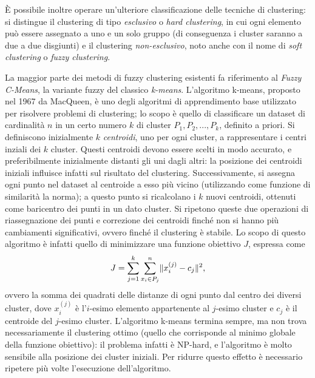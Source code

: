 \documentclass[oneside, openany]{book}
\DeclarePairedDelimiter{\norma}{\lVert}{\rVert}
\begin{document}
			\`E possibile inoltre operare un'ulteriore classificazione delle tecniche di clustering: si distingue il clustering di tipo \textit{esclusivo} o \textit{hard clustering}, in cui ogni elemento può essere assegnato a uno e un solo gruppo (di conseguenza i cluster saranno a due a due disgiunti) e il clustering \textit{non-esclusivo}, noto anche con il nome di \textit{soft clustering} o \textit{fuzzy clustering}.
			
			La maggior parte dei metodi di fuzzy clustering esistenti fa riferimento al \textit{Fuzzy C-Means}, la variante fuzzy del classico \textit{k-means}. L'algoritmo k-means, proposto nel 1967 da MacQueen, è uno degli algoritmi di apprendimento base utilizzato per risolvere problemi di clustering; lo scopo è quello di classificare un dataset di cardinalità $n$ in un certo numero $k$ di cluster $P_1,P_2,...,P_k$, definito a priori.
			Si definiscono inizialmente $k$ \textit{centroidi}, uno per ogni cluster, a rappresentare i centri inziali dei $k$ cluster. Questi centroidi devono essere scelti in modo accurato, e preferibilmente inizialmente distanti gli uni dagli altri: la posizione dei centroidi iniziali influisce infatti sul risultato del clustering. Successivamente, si assegna ogni punto nel dataset al centroide a esso più vicino (utilizzando come funzione di similarità la norma); a questo punto si ricalcolano i $k$ nuovi centroidi, ottenuti come baricentro dei punti in un dato cluster. Si ripetono queste due operazioni di riassegnazione dei punti e correzione dei centroidi finché non si hanno più cambiamenti significativi, ovvero finché il clustering è stabile. Lo scopo di questo algoritmo è infatti quello di minimizzare una funzione obiettivo $J$, espressa come
			\[
			J = \sum_{j=1}^{k}\sum_{x_i\in P_j}^{n}\norma{x_i^{(j)}-c_j}^2\text{,}
			\]
			ovvero la somma dei quadrati delle distanze di ogni punto dal centro dei diversi cluster, dove $x_i^{(j)}$ è l'$i$-esimo elemento appartenente al $j$-esimo cluster e $c_j$ è il centroide del $j$-esimo cluster. 
			L'algoritmo k-means termina sempre, ma non trova necessariamente il clustering ottimo (quello che corrisponde al minimo globale della funzione obiettivo): il problema infatti è NP-hard, e l'algoritmo è molto sensibile alla posizione dei cluster iniziali. Per ridurre questo effetto è necessario ripetere più volte l'esecuzione dell'algoritmo.\\
\end{document}
